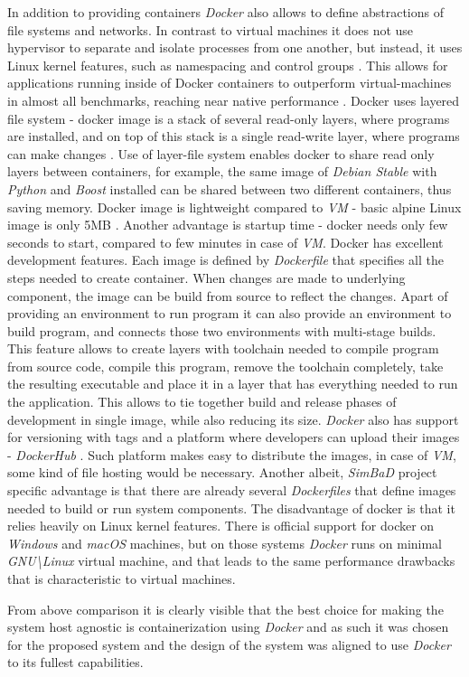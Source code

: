 In addition to providing containers \textit{Docker} also allows to define abstractions of file systems and networks. In contrast to virtual machines it does not use hypervisor to separate and isolate processes from one another, but instead, it uses Linux kernel features, such as namespacing and control groups \cite{DockerOverview}. This allows for applications running inside of Docker containers to outperform virtual-machines in almost all benchmarks, reaching near native performance \cite{Felter2015}. Docker uses layered file system - docker image is a stack of several read-only layers, where programs are installed, and on top of this stack is a single read-write layer, where programs can make changes \cite{DockerStorage}. Use of layer-file system enables docker to share read only layers between containers, for example, the same image of \textit{Debian Stable} with \textit{Python} and \textit{Boost} installed can be shared between two different containers, thus saving memory. Docker image is lightweight compared to \textit{VM} - basic alpine Linux image is only 5MB \cite{Alpine}. Another advantage is startup time - docker needs only few seconds to start, compared to few minutes in case of \textit{VM}. 
Docker has excellent development features. Each image is defined by \textit{Dockerfile} that specifies all the steps needed to create container. When changes are made to underlying component, the image can be build from source to reflect the changes. Apart of providing an environment to run program it can also provide an environment to build program, and connects those two environments with multi-stage builds. This feature allows to create layers with toolchain needed to compile program from source code, compile this program, remove the toolchain completely, take the resulting executable and place it in a layer that has everything needed to run the application. This allows to tie together build and release phases of development in single image, while also reducing its size. \textit{Docker} also has support for versioning with tags \cite{DockerTag} and a platform where developers can upload their images - \textit{DockerHub} \cite{DockerHub}. Such platform makes easy to distribute the images, in case of \textit{VM}, some kind of file hosting would be necessary. Another albeit, \textit{SimBaD} project specific advantage is that there are already several \textit{Dockerfiles} that define images needed to build or run system components.
The disadvantage of docker is that it relies heavily on Linux kernel features. There is official support for docker on \textit{Windows} and \textit{macOS} machines, but on those systems \textit{Docker} runs on minimal \textit{GNU\textbackslash Linux} virtual machine, and that leads to the same performance drawbacks that is characteristic to virtual machines. 

From above comparison it is clearly visible that the best choice for making the system host agnostic is containerization using \textit{Docker} and as such it was chosen for the proposed system and the design of the system was aligned to use \textit{Docker} to its fullest capabilities.

